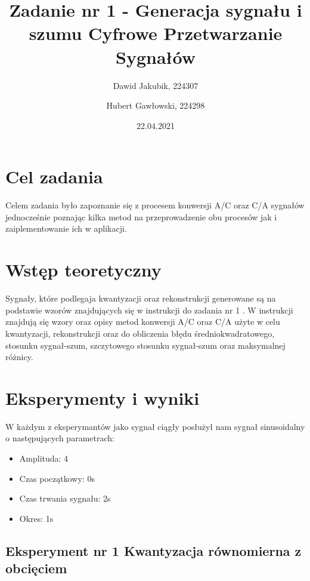 \documentclass[12pt]{article}
\title{{\bf Zadanie nr 1 - Generacja sygnału i szumu}\linebreak
Cyfrowe Przetwarzanie Sygnałów}
\author{Dawid Jakubik, 224307 \and Hubert Gawłowski, 224298}
\date{22.04.2021}
\begin{document}
\clearpage\maketitle
\thispagestyle{empty}
\newpage
\setcounter{page}{1}
\section{Cel zadania}

Celem zadania było zapoznanie się z procesem konwersji A/C oraz C/A sygnałów jednocześnie poznając kilka metod na przeprowadzenie obu procesów jak i zaiplementowanie ich w aplikacji. 

\section{Wstęp teoretyczny}

Sygnały, które podlegaja kwantyzacji oraz rekonstrukcji generowane są na podstawie wzorów znajdujących się w instrukcji do zadania nr 1 \cite{instrukcja1}. W instrukcji \cite{instrukcji2} znajdują się wzory oraz opisy metod konwersji A/C oraz C/A użyte w celu kwantyzacji, rekonstrukcji oraz do obliczenia błędu średniokwadratowego, stosunku sygnał-szum, szczytowego stosunku sygnał-szum oraz maksymalnej różnicy.


\section{Eksperymenty i wyniki}

W każdym z eksperymantów jako sygnał ciągły posłużył nam sygnał sinusoidalny o następujących parametrach: 
\begin{itemize}
	\item Amplituda: 4
	\item Czas początkowy: 0s
	\item Czas trwania sygnału: 2s
	\item Okres: 1s
\end{itemize}

\subsection{Eksperyment nr 1 Kwantyzacja równomierna z obcięciem}
\end{document}

